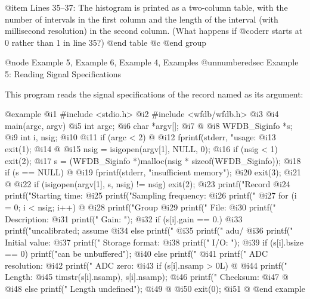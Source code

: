 {{{{{{{{{@item Lines 35--37:
The histogram is printed as a two-column table, with the number of
intervals in the first column and the length of the interval (with
millisecond resolution) in the second column. (What happens if
@code{rr} starts at 0 rather than 1 in line 35?)
@end table
@c @end group

@node     Example 5, Example 6, Example 4, Examples
@unnumberedsec Example 5: Reading Signal Specifications

This program reads the signal specifications of the record named as its
argument:

@example
 @i{1}  #include <stdio.h>
 @i{2}  #include <wfdb/wfdb.h>
 @i{3}
 @i{4}  main(argc, argv)
 @i{5}  int argc;
 @i{6}  char *argv[];
 @i{7}  @{
 @i{8}      WFDB_Siginfo *s;
 @i{9}      int i, nsig;
@i{10}
@i{11}      if (argc < 2) @{
@i{12}          fprintf(stderr, "usage: %
@i{13}          exit(1);
@i{14}      @}
@i{15}      nsig = isigopen(argv[1], NULL, 0);
@i{16}      if (nsig < 1) exit(2);
@i{17}      s = (WFDB_Siginfo *)malloc(nsig * sizeof(WFDB_Siginfo));
@i{18}      if (s == NULL) @{
@i{19}          fprintf(stderr, "insufficient memory\n");
@i{20}	        exit(3);
@i{21}      @}
@i{22}      if (isigopen(argv[1], s, nsig) != nsig) exit(2);
@i{23}      printf("Record %
@i{24}      printf("Starting time: %
@i{25}      printf("Sampling frequency: %
@i{26}      printf("%
@i{27}      for (i = 0; i < nsig; i++) @{
@i{28}          printf("Group %
@i{29}          printf(" File: %
@i{30}          printf(" Description: %
@i{31}          printf(" Gain: ");
@i{32}          if (s[i].gain == 0.)
@i{33}              printf("uncalibrated; assume %
@i{34}          else printf("%
@i{35}          printf(" adu/%
@i{36}          printf(" Initial value: %
@i{37}          printf(" Storage format: %
@i{38}          printf(" I/O: ");
@i{39}          if (s[i].bsize == 0) printf("can be unbuffered\n");
@i{40}          else printf("%
@i{41}          printf(" ADC resolution: %
@i{42}          printf(" ADC zero: %
@i{43}          if (s[i].nsamp > 0L) @{
@i{44}              printf(" Length: %
@i{45}                     timstr(s[i].nsamp), s[i].nsamp);
@i{46}              printf(" Checksum: %
@i{47}          @}
@i{48}          else printf(" Length undefined\n");
@i{49}      @}
@i{50}      exit(0);
@i{51}  @}
@end example

}}}}}}}}}
